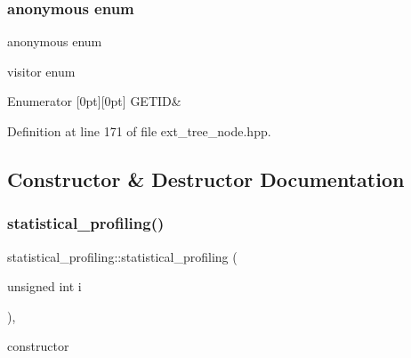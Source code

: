 \subsubsection{\texorpdfstring{anonymous enum}{anonymous enum}}
{\footnotesize\ttfamily anonymous enum}



visitor enum 

\begin{DoxyEnumFields}{Enumerator}
[0pt][0pt]{}\mbox{\label{structstatistical__profiling_a6a5c10301aa9c5c966b40e9d41a9538baa4eaa19d0b3e6a7412c34af3ffd6adfe}} 
G\+E\+T\+ID&\\
\hline

\end{DoxyEnumFields}


Definition at line 171 of file ext\+\_\+tree\+\_\+node.\+hpp.



\subsection{Constructor \& Destructor Documentation}
\mbox{\label{structstatistical__profiling_a920468964d963c708d02f925039ecc1a}} 
\subsubsection{\texorpdfstring{statistical\+\_\+profiling()}{statistical\_profiling()}}
{\footnotesize\ttfamily statistical\+\_\+profiling\+::statistical\+\_\+profiling (\begin{DoxyParamCaption}\item[{unsigned int}]{i }\end{DoxyParamCaption})\hspace{0.3cm}{\ttfamily [inline]}, {\ttfamily [explicit]}}



constructor 



